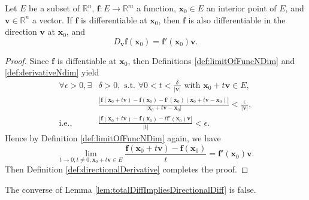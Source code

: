 \begin{lem}
  \label{lem:totalDiffImpliesDirectionalDiff}
  Let $E$ be a subset of $\mathbb{R}^n$,
  $\mathbf{f}: E\rightarrow \mathbb{R}^m$ a function,
  $\mathbf{x}_0\in E$ an interior point of $E$,
  and $\mathbf{v}\in \mathbb{R}^n$ a vector.
  If $\mathbf{f}$ is differentiable at $\mathbf{x}_0$,
  then $\mathbf{f}$ is also differentiable in the direction $\mathbf{v}$
  at $\mathbf{x}_0$, and
  \begin{equation}
    \label{eq:totalDiffImpliesDirectionalDiff}
    D_\mathbf{v} \mathbf{f}(\mathbf{x}_0)
    = \mathbf{f}'(\mathbf{x}_0) \mathbf{v}.
  \end{equation}
\end{lem}
\begin{proof}
  Since $\mathbf{f}$ is diffentiable at $\mathbf{x}_{0}$, then
  Definitions \ref{def:limitOfFuncNDim} and \ref{def:derivativeNdim}
  yield
  \begin{align*}
    \forall \epsilon>0, \exists
    &\delta>0,\text{ s.t. }
    \forall 0<t<\frac{\delta}{|\mathbf{v}|}
    \text{ with }\mathbf{x}_{0}+t\mathbf{v}\in E, \\
    &\frac{|\mathbf{f}(\mathbf{x}_{0}+t\mathbf{v})
      -\mathbf{f}(\mathbf{x}_{0})-\mathbf{f}'(\mathbf{x}_{0})
      (\mathbf{x}_{0}+t\mathbf{v}-\mathbf{x}_{0})|}
      {|\mathbf{x}_{0}+t\mathbf{v}-\mathbf{x}_{0}|}
      <\frac{\epsilon}{|\mathbf{v}|},\\
    \text{i.e., } &\frac{|\mathbf{f}(\mathbf{x}_{0}+t\mathbf{v})
                    -\mathbf{f}(\mathbf{x}_{0})
      -t\mathbf{f}'(\mathbf{x}_{0})\mathbf{v}|}{|t|}
      <\epsilon.
  \end{align*}
  Hence by Definition \ref{def:limitOfFuncNDim} again,
  we have
  \begin{displaymath}
    \lim_{t\rightarrow0;t\neq 0,\mathbf{x}_{0}+t\mathbf{v}\in E}
    \frac{\mathbf{f}(\mathbf{x}_{0}+t\mathbf{v})
      -\mathbf{f}(\mathbf{x}_{0})}{t}=\mathbf{f}'(\mathbf{x}_{0})\mathbf{v}.
  \end{displaymath}
  Then Definition \ref{def:directionalDerivative} completes the proof.
\end{proof}

\begin{rem}
  The converse of Lemma \ref{lem:totalDiffImpliesDirectionalDiff} is
  false.
\end{rem}

